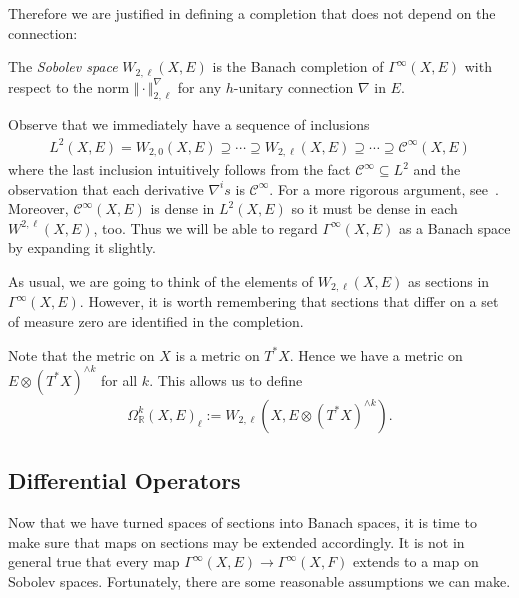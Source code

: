 \documentclass[12pt]{ociamthesis}  %
\begin{document}
Therefore we are justified in defining a completion that does not depend
on the connection:

\begin{definition}
  The \emph{Sobolev space} $W_{2,\ell}(X,E)$ is the Banach completion of
  $\Gamma^\infty(X,E)$ with respect to the norm
  $\Vert\cdot\Vert_{2,\ell}^\nabla$ for any $h$-unitary connection
  $\nabla$ in $E$.
\end{definition}

Observe that we immediately have a sequence of inclusions
\begin{align*}
  L^2(X,E) =
  W_{2,0}(X,E) \supseteq
  \cdots \supseteq
  W_{2,\ell}(X,E) \supseteq
  \cdots
  \supseteq
  \mathscr C^\infty(X,E)
\end{align*}
where the last inclusion intuitively follows from the fact
$\mathscr C^\infty \subseteq L^2$ and the observation that each derivative
$\nabla^i s$ is $\mathscr C^\infty$. For a more rigorous argument, see~\cite[Corollary 3.8.3]{bc2009}.
Moreover, $\mathscr C^\infty(X,E)$ is dense in $L^2(X,E)$ so it must be dense in each
$W^{2,\ell}(X,E)$, too. Thus we will be able to regard $\Gamma^\infty(X,E)$
as a Banach space by expanding it slightly.

As usual, we are going to think of the elements of $W_{2,\ell}(X,E)$ as
sections in $\Gamma^\infty(X,E)$. However, it is worth remembering that
sections that differ on a set of measure zero are identified in the
completion.

\begin{example}
  Note that the metric on $X$ is a metric on $T^*X$. Hence we have
  a metric on $E\otimes (T^*X)^{\wedge k}$ for all $k$. This allows
  us to define
  \begin{align*}
    \Omega_{\mathbb{R}}^k(X,E)_\ell := W_{2,\ell}(X,E\otimes(T^*X)^{\wedge k}).
  \end{align*}
\end{example}

\subsection{Differential Operators}

Now that we have turned spaces of sections into Banach spaces, it is
time to make sure that maps on sections may be extended accordingly.
It is not in general true that every map
$\Gamma^\infty(X,E)\to\Gamma^\infty(X,F)$ extends to a map on
Sobolev spaces. Fortunately, there are some reasonable assumptions
we can make.
\end{document}
